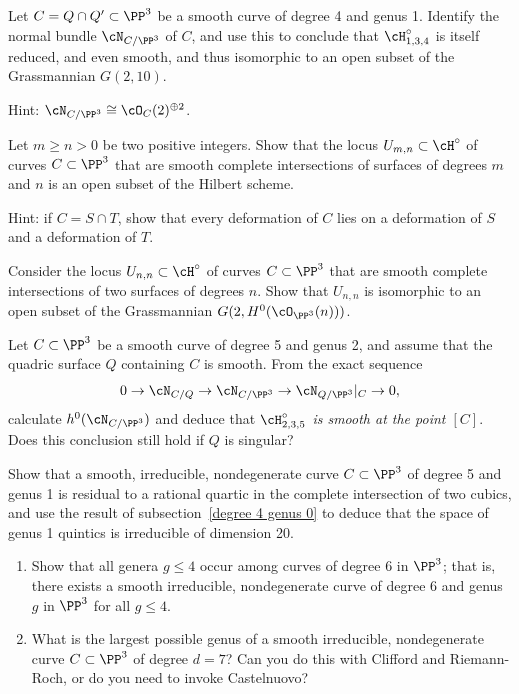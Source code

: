 \begin{exercise}\label{hilb 1,3,4}
Let $C = Q \cap Q' \subset \PP^3$ be a smooth curve of degree 4 and genus 1. Identify the normal bundle $\cN_{C/\PP^3}$ of $C$, and use this to conclude that $\cH^\circ_{1,3,4}$ is itself reduced, and even smooth, and thus isomorphic to an open subset of the Grassmannian $G(2,10)$.

Hint: $\cN_{C/\PP^3} \cong \cO_C(2)^{\oplus 2}$.
\end{exercise}

\begin{exercise}\label{complete intersection open}
Let $m \geq n >0$ be two positive integers. Show that the locus $U_{m,n} \subset \cH^\circ$ of curves $C \subset \PP^3$ that are smooth complete intersections of surfaces of degrees $m$ and $n$ is an open subset of the Hilbert scheme.

Hint: if $C = S \cap T$, show that every deformation of $C$ lies on a deformation of $S$ and a deformation of $T$.
\end{exercise}

\begin{exercise}\label{first complete intersection exercise}
Consider  the locus $U_{n,n} \subset \cH^\circ$ of curves $C \subset \PP^3$ that are smooth complete intersections of two surfaces of degrees $n$. Show that $U_{n,n}$ 
is isomorphic to an open subset of the Grassmannian $G(2, H^0(\cO_{\PP^3}(n)))$.
\end{exercise}

\begin{exercise}
Let $C \subset \PP^3$ be a smooth curve of degree 5 and genus 2, and assume that the quadric surface $Q$ containing $C$ is smooth. From the exact sequence
$$
0 \to \cN_{C/Q} \to  \cN_{C/\PP^3} \to  \cN_{Q/\PP^3}|_C \to 0,
$$
calculate $h^0(\cN_{C/\PP^3})$ and deduce that \emph{$\cH^\circ_{2,3,5}$ is smooth at the point $[C]$}. Does  this conclusion still hold if $Q$ is singular?
\end{exercise}

\begin{exercise}\label{quintics genus 1}
Show that a smooth, irreducible, nondegenerate curve $C \subset \PP^3$ of degree 5 and genus 1 is residual to a rational quartic in the complete intersection of two cubics, and use the result of subsection~\ref{degree 4 genus 0} to deduce that the space of genus 1 quintics is irreducible of dimension 20.
\end{exercise}

\begin{exercise}
\begin{enumerate}
\item Show that all genera $g \leq 4$  occur among curves of degree 6 in $\PP^3$; that is, there exists a smooth irreducible, nondegenerate curve of degree 6 and genus $g$ in $\PP^3$ for all $g \leq 4$.
\item What is the largest possible genus of a smooth irreducible, nondegenerate curve $C \subset \PP^3$ of degree $d=7$? Can you do this with Clifford and Riemann-Roch, or do you need to invoke Castelnuovo?
\end{enumerate}
\end{exercise}


